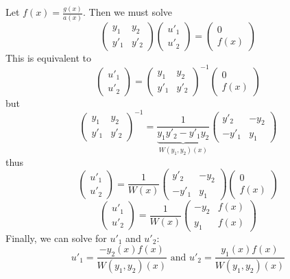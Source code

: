 \documentclass[11pt]{article}
\begin{document}
	Let $f(x) = \frac{g(x)}{a(x)}$. Then we must solve
		$$
			\left(
				\begin{array}{cc}
					y_1 & y_2 \\
					y'_1 & y'_2
				\end{array}
			\right)
			\left(
				\begin{array}{c}
					u'_1 \\
					u'_2
				\end{array}
			\right)
			=
			\left(
				\begin{array}{c}
					0 \\
					f(x)
				\end{array}
			\right)
		$$
	This is equivalent to
		$$
			\left(
				\begin{array}{c}
					u'_1 \\
					u'_2
				\end{array}
			\right)
			=
			\left(
				\begin{array}{cc}
					y_1 & y_2 \\
					y'_1 & y'_2
				\end{array}
			\right)^{-1}
			\left(
				\begin{array}{c}
					0 \\
					f(x)
				\end{array}
			\right)
		$$
	but
		$$
			\left(
				\begin{array}{cc}
					y_1 & y_2 \\
					y'_1 & y'_2
				\end{array}
			\right)^{-1}
			=
			\frac{1}{\underbrace{y_1 y'_2 - y'_1 y_2}_{W(y_1, y_2)(x)}}
			\left(
				\begin{array}{cc}
					y'_2 & -y_2 \\
					-y'_1 & y_1
				\end{array}
			\right)
		$$
	thus
		$$
			\left(
				\begin{array}{c}
					u'_1 \\
					u'_2
				\end{array}
			\right)
			=
			\frac{1}{W(x)}
			\left(
				\begin{array}{cc}
					y'_2 & -y_2 \\
					-y'_1 & y_1
				\end{array}
			\right)
			\left(
				\begin{array}{c}
					0 \\
					f(x)
				\end{array}
			\right)
		$$
		$$
			\left(
				\begin{array}{c}
					u'_1 \\
					u'_2
				\end{array}
			\right)
			=
			\frac{1}{W(x)}
			\left(
				\begin{array}{cc}
					-y_2 & f(x) \\
					y_1 & f(x)
				\end{array}
			\right)
		$$
Finally, we can solve for $u'_1$ and $u'_2$:
	\[
		\boxed{u'_1 = \frac{-y_2(x) f(x)}{W(y_1, y_2)(x)} \text{ and } u'_2 = \frac{y_1(x) f(x)}{W(y_1, y_2)(x)}}
	\]
\end{document}
